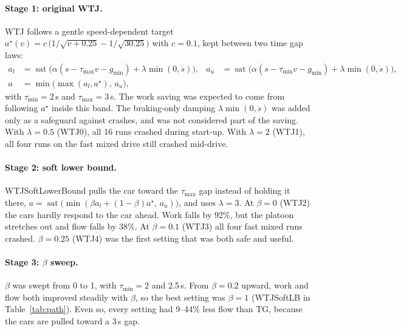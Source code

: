 \documentclass[11pt]{article}
\newcommand{\sat}{\operatorname{sat}}
\begin{document}
\paragraph{Stage 1: original WTJ.}
WTJ follows a gentle speed-dependent target
$a^\star(v) = c\,\big(1/\sqrt{v+0.25} - 1/\sqrt{30.25}\big)$ with $c=0.1$, kept between two time gap laws:
\begin{align*}
a_l &= \sat\!\big(\alpha(s-\tau_{\max}v-g_{\min}) + \lambda\min(0,\dot s)\big), &
a_u &= \sat\!\big(\alpha(s-\tau_{\min}v-g_{\min}) + \lambda\min(0,\dot s)\big), \\
a &= \min\!\big(\max(a_l, a^\star),\, a_u\big), & &
\end{align*}
with $\tau_{\min}=2$\,s and $\tau_{\max}=3$\,s. The work saving was expected to come from following
$a^\star$ inside this band. The braking-only damping $\lambda\min(0,\dot s)$ was added only as a safeguard
against crashes, and was not considered part of the saving. With $\lambda=0.5$ (WTJ0), all 16 runs crashed
during start-up. With $\lambda=2$ (WTJ1), all four runs on the fast mixed drive still crashed mid-drive.

\paragraph{Stage 2: soft lower bound.}
WTJSoftLowerBound pulls the car toward the $\tau_{\max}$ gap instead of holding it there,
$a=\sat\big(\min(\beta a_l+(1-\beta)a^\star,\,a_u)\big)$, and uses $\lambda=3$. At $\beta=0$ (WTJ2) the
cars hardly respond to the car ahead. Work falls by 92\%, but the platoon stretches out and flow falls by
38\%. At $\beta=0.1$ (WTJ3) all four fast mixed runs crashed. $\beta=0.25$ (WTJ4) was the first setting
that was both safe and useful.

\paragraph{Stage 3: $\beta$ sweep.}
$\beta$ was swept from 0 to 1, with $\tau_{\min}=2$ and 2.5\,s. From $\beta=0.2$ upward, work and flow both
improved steadily with $\beta$, so the best setting was $\beta=1$ (WTJSoftLB in Table~\ref{tab:path}). Even so, every setting had 9--44\% less
flow than TG, because the cars are pulled toward a 3\,s gap.
\end{document}
